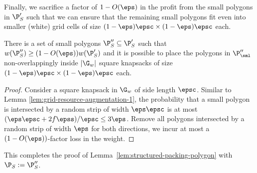Finally, we sacrifice a factor of $1-O(\eps)$ in the profit from the small polygons in $\P'_S$ such that we can ensure that
the remaining small polygons fit even into smaller (white) grid cells of size $(1-\eps)\epsc \times(1-\eps)\epsc$ each.

\begin{lem} \label{lem:grid-resource-augmentation}There is a set
	of small polygons $\P''_{S}\subseteq\P'_{S}$ such that $w(\P''_{S})\ge(1-O(\eps))w(\P'_{S})$
	and it is possible to place the polygons in $\P''_{\sml}$ non-overlappingly
	inside $|\G_{w}|$ square knapsacks of size $(1-\eps)\epsc \times(1-\eps)\epsc$
	each. \end{lem}
\begin{proof}
	Consider a square knapsack in $\G_{w}$ of side length $\epsc$.
        Similar to Lemma \ref{lem:grid-resource-augmentation-1}, the probability that a small polygon is intersected by a random strip of width $\eps \epsc$ is at most $(\eps\epsc+2f\epss)/\epsc \le 3\eps$.
	Remove all polygons intersected by a random strip of width $\eps$ for both directions, we incur at most a $(1-O(\eps))$-factor loss in the weight.
\end{proof}
This completes the proof of Lemma~\ref{lem:structured-packing-polygon} with $\P_{S}:= \P''_{S}$.

